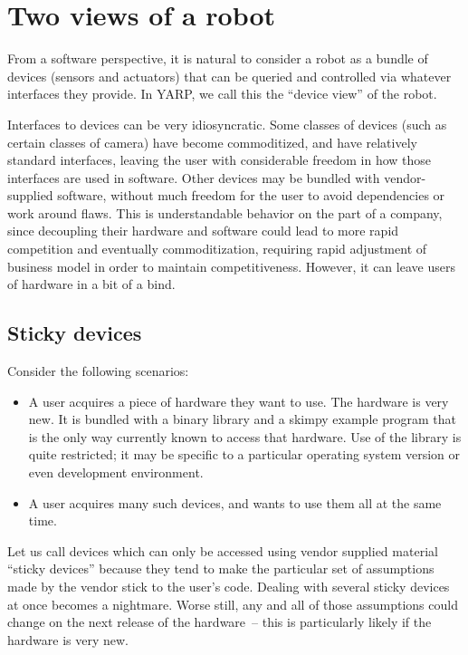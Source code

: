 

\section{Two views of a robot}

From a software perspective, it is natural to consider a robot
as a bundle of devices (sensors and actuators) that can be
queried and controlled via whatever interfaces they provide.
In YARP, we call this the ``device view'' of the robot.

Interfaces to devices can be very idiosyncratic.  Some
classes of devices (such as certain classes of camera) have become
commoditized, and have relatively standard interfaces, leaving the
user with considerable freedom in how those interfaces are used in
software.  Other devices may be bundled with vendor-supplied software,
without much freedom for the user to avoid dependencies or work around
flaws.  This is understandable behavior on the part of a company,
since decoupling their hardware and software could lead to more rapid
competition and eventually commoditization, requiring rapid adjustment
of business model in order to maintain competitiveness.  However,
it can leave users of hardware in a bit of a bind.


\subsection{Sticky devices}

Consider the following scenarios:

\begin{itemize}

\item A user acquires a piece of hardware they want to use.  The
hardware is very new.  It is bundled with a binary library and a
skimpy example program that is the only way currently known to access
that hardware.  Use of the library is quite restricted; it may be
specific to a particular operating system version or even development
environment.

\item A user acquires many such devices, and wants to use them
all at the same time.

\end{itemize}

Let us call devices which can only be accessed using vendor supplied
material ``sticky devices'' because they tend to make the particular
set of assumptions made by the vendor stick to the user's code.
Dealing with several sticky devices at once becomes a nightmare.
Worse still, any and all of those assumptions could change on the
next release of the hardware~-- this is particularly likely if the 
hardware is very new.


